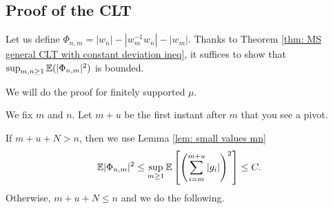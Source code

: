 \subsection{Proof of the CLT}

Let us define $\Phi_{n,m}=|w_n|-|w_m^{-1}w_n|-|w_m|$. Thanks to Theorem \ref{thm: MS general CLT with constant deviation ineq}, it suffices to show that $\sup_{m,n\ge 1}\mathbb{E}(|\Phi_{n,m}|^2)$ is bounded.

We will do the proof for finitely supported $\mu$.

We fix $m$ and $n$. Let $m+u$ be the first instant after $m$ that you see a pivot.

If $m+u+N>n$, then we use Lemma \ref{lem: small values mn} 
$$
\mathbb{E} |\Phi_{n,m}|^2\le \sup_{m\ge 1}\mathbb{E}\left[\left( \sum_{i=m}^{m+u}|g_i| \right)^2\right]\le C.
$$
Otherwise, $m+u+N\le n$ and we do the following.


